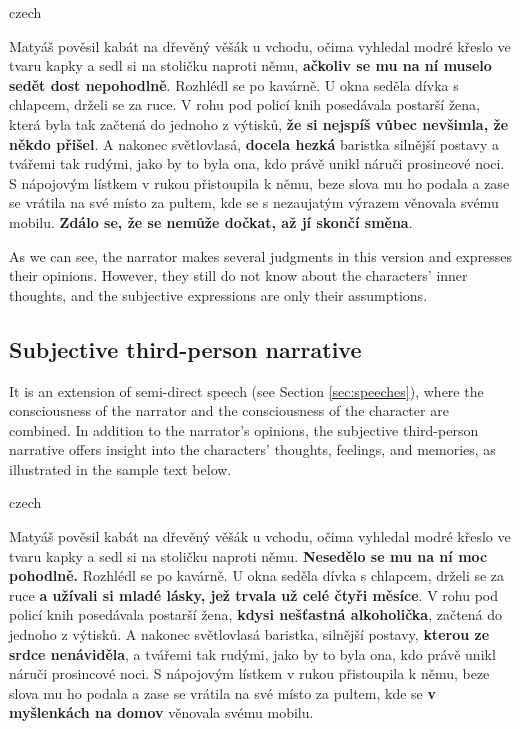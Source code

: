 \begin{otherlanguage*}{czech}
\begin{quoting}
Matyáš pověsil kabát na dřevěný věšák u vchodu, očima vyhledal modré křeslo ve tvaru kapky a sedl si na stoličku naproti němu, \textbf{ačkoliv se mu na ní muselo sedět dost nepohodlně}. Rozhlédl se po kavárně. U okna seděla dívka s chlapcem, drželi se za ruce. V rohu pod policí knih posedávala postarší žena, která byla tak začtená do jednoho z výtisků, \textbf{že si nejspíš vůbec nevšimla, že někdo přišel}. A nakonec světlovlasá, \textbf{docela hezká} baristka silnější postavy a tvářemi tak rudými, jako by to byla ona, kdo právě unikl náruči prosincové noci. S nápojovým lístkem v rukou přistoupila k němu, beze slova mu ho podala a zase se vrátila na své místo za pultem, kde se s nezaujatým výrazem věnovala svému mobilu. \textbf{Zdálo se, že se nemůže dočkat, až jí skončí směna}.
\newline
\end{quoting}
\end{otherlanguage*}

As we can see, the narrator makes several judgments in this version and expresses their opinions. However, they still do not know about the characters' inner thoughts, and the subjective expressions are only their assumptions.

\subsection{Subjective third-person narrative}

It is an extension of semi-direct speech (see Section \ref{sec:speeches}), where the consciousness of the narrator and the consciousness of the character are combined. \cite[p.~393]{muller-sidak-slovnik}
In addition to the narrator's opinions, the subjective third-person narrative offers insight into the characters' thoughts, feelings, and memories, as illustrated in the sample text below.
\newline
\begin{otherlanguage*}{czech}
\begin{quoting}
Matyáš pověsil kabát na dřevěný věšák u vchodu, očima vyhledal modré křeslo ve tvaru kapky a sedl si na stoličku naproti němu. \textbf{Nesedělo se mu na ní moc pohodlně.} Rozhlédl se po kavárně. U okna seděla dívka s chlapcem, drželi se za ruce \textbf{a užívali si mladé lásky, jež trvala už celé čtyři měsíce}. V rohu pod policí knih posedávala postarší žena, \textbf{kdysi nešťastná alkoholička}, začtená do jednoho z výtisků. A nakonec světlovlasá baristka, silnější postavy, \textbf{kterou ze srdce nenáviděla}, a tvářemi tak rudými, jako by to byla ona, kdo právě unikl náruči prosincové noci. S nápojovým lístkem v rukou přistoupila k němu, beze slova mu ho podala a zase se vrátila na své místo za pultem, kde se \textbf{v myšlenkách na domov} věnovala svému mobilu.
\end{quoting}
\end{otherlanguage*}

